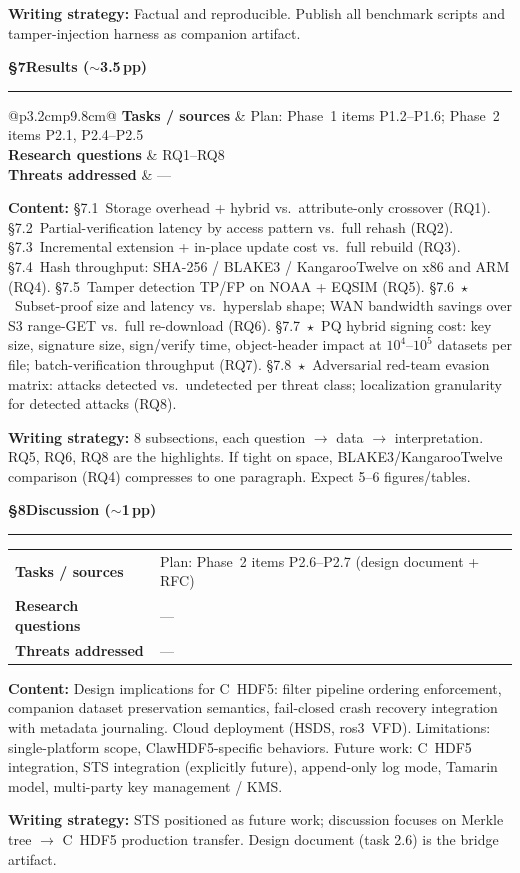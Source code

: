 \documentclass[11pt]{article}
\makeatletter
\newcommand{\mapsec}[3]{%
  \smallskip\noindent
  \begin{tabular}{@{}p{3.2cm}p{9.8cm}@{}}
  \toprule
  \textbf{Tasks / sources}    & #1 \\
  \textbf{Research questions} & #2 \\
  \textbf{Threats addressed}  & #3 \\
  \bottomrule
  \end{tabular}\smallskip}
\makeatother
\begin{document}
\noindent\textbf{Writing strategy:} Factual and reproducible. Publish all benchmark
scripts and tamper-injection harness as companion artifact.

\bigskip
\noindent\textcolor{blue!60!black}{\textbf{\S7\quad Results \hfill($\sim$3.5\,pp)}}
\par\noindent\rule{\linewidth}{0.4pt}
\mapsec{Plan: Phase~1 items P1.2--P1.6; Phase~2 items P2.1, P2.4--P2.5}{RQ1--RQ8}{---}

\noindent\textbf{Content:}
\S7.1~Storage overhead + hybrid vs.\ attribute-only crossover (RQ1).
\S7.2~Partial-verification latency by access pattern vs.\ full rehash (RQ2).
\S7.3~Incremental extension + in-place update cost vs.\ full rebuild (RQ3).
\S7.4~Hash throughput: SHA-256 / BLAKE3 / KangarooTwelve on x86 and ARM (RQ4).
\S7.5~Tamper detection TP/FP on NOAA + EQSIM (RQ5).
\S7.6~$\star$~Subset-proof size and latency vs.\ hyperslab shape; WAN bandwidth savings
over S3 range-GET vs.\ full re-download (RQ6).
\S7.7~$\star$~PQ hybrid signing cost: key size, signature size, sign/verify time, object-header
impact at $10^4$--$10^5$ datasets per file; batch-verification throughput (RQ7).
\S7.8~$\star$~Adversarial red-team evasion matrix: attacks detected vs.\ undetected per
threat class; localization granularity for detected attacks (RQ8).

\noindent\textbf{Writing strategy:} 8 subsections, each question $\rightarrow$ data
$\rightarrow$ interpretation. RQ5, RQ6, RQ8 are the highlights. If tight on space,
BLAKE3/KangarooTwelve comparison (RQ4) compresses to one paragraph.
Expect 5--6 figures/tables.

\bigskip
\noindent\textcolor{blue!60!black}{\textbf{\S8\quad Discussion \hfill($\sim$1\,pp)}}
\par\noindent\rule{\linewidth}{0.4pt}
\mapsec{Plan: Phase~2 items P2.6--P2.7 (design document + RFC)}{---}{---}

\noindent\textbf{Content:} Design implications for C~HDF5: filter pipeline ordering
enforcement, companion dataset preservation semantics, fail-closed crash recovery
integration with metadata journaling. Cloud deployment (HSDS, ros3~VFD). Limitations:
single-platform scope, ClawHDF5-specific behaviors. Future work: C~HDF5 integration,
STS integration (explicitly future), append-only log mode, Tamarin model, multi-party
key management / KMS.

\noindent\textbf{Writing strategy:} STS positioned as future work; discussion focuses
on Merkle tree $\rightarrow$ C~HDF5 production transfer. Design document (task 2.6) is
the bridge artifact.
\end{document}
